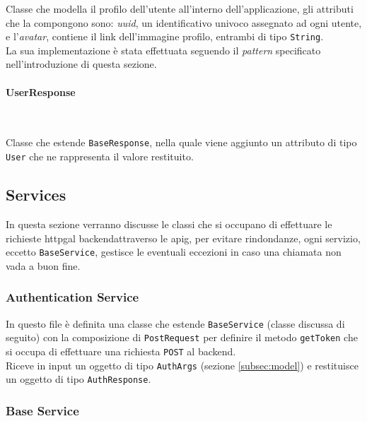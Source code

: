 \noindent Classe che modella il profilo dell'utente all'interno dell'applicazione, gli attributi che la compongono sono: \emph{uuid}, un identificativo univoco assegnato ad ogni utente, e l'\emph{avatar}, contiene il link dell'immagine profilo, entrambi di tipo \lstinline{String}. \\
La sua implementazione è stata effettuata seguendo il \emph{pattern} specificato nell'introduzione di questa sezione.

\paragraph*{UserResponse} ~ \\
\label{par:user-response}

\noindent Classe che estende \lstinline{BaseResponse}, nella quale viene aggiunto un attributo di tipo \lstinline{User} che ne rappresenta il valore restituito.

\subsection{Services}
\label{subsec:services}

In questa sezione verranno discusse le classi che si occupano di effettuare le richieste \gls{httpg}\glsoccur al \gls{backend}\glsoccur attraverso le \gls{apig}\glsoccur, per evitare rindondanze, ogni servizio, eccetto \lstinline{BaseService}, gestisce le eventuali eccezioni in caso una chiamata non vada a buon fine.

\subsubsection*{Authentication Service}
\label{subsubsec:authentication-service}

In questo file è definita una classe che estende \lstinline{BaseService} (classe discussa di seguito) con la composizione di \lstinline{PostRequest} per definire il metodo \lstinline{getToken} che si occupa di effettuare una richiesta \lstinline{POST} al \gls{backend}\glsoccur. \\
Riceve in input un oggetto di tipo \lstinline{AuthArgs} (sezione \ref{subsec:model}) e restituisce un oggetto di tipo \lstinline{AuthResponse}.

\subsubsection*{Base Service}
\label{subsubsec:base-service}

